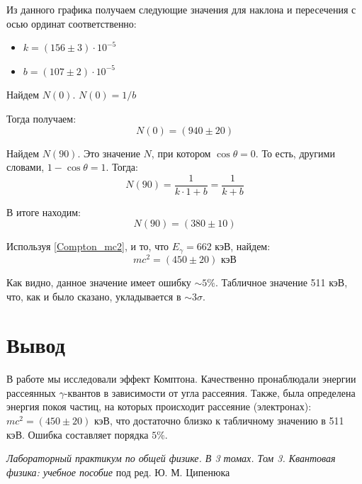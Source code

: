 \documentclass[12pt,a4paper]{article}
\begin{document}
	Из данного графика получаем следующие значения для наклона и пересечения с осью ординат соответственно:
	\begin{itemize}
		\item $k = (156 \pm 3) \cdot 10^{-5}$
		
		\item $b = (107 \pm 2) \cdot 10^{-5}$
	\end{itemize}
	
	Найдем $N(0)$. $N(0) = 1/b$

	Тогда получаем:
	\begin{equation*}
		\boxed{N(0) = (940 \pm 20)}
	\end{equation*}

	Найдем $N(90)$. Это значение $N$, при котором $\cos\theta = 0$. То есть, другими словами, $1 - \cos\theta = 1$. Тогда:
	\begin{equation*}
		N(90) = \frac{1}{k \cdot 1 + b} = \frac{1}{k + b}
	\end{equation*}

	В итоге находим:
	\begin{equation*}
		\boxed{N(90) = (380 \pm 10)}
	\end{equation*}

	
	Используя \eqref{Compton_mc2}, и то, что $E_\gamma = 662$ кэВ, найдем:
	\begin{equation*}
		\boxed{mc^2 = (450 \pm 20)\text{ кэВ}}
	\end{equation*}

	Как видно, данное значение имеет ошибку $\sim 5\%$. Табличное значение 511 кэВ, что, как и было сказано, укладывается в $\sim 3\sigma$.
	

    \clearpage
    
	\section*{Вывод}
 
    В работе мы исследовали эффект Комптона. Качественно пронаблюдали энергии рассеянных $\gamma$-квантов в зависимости от угла рассеяния. Также, была определена энергия покоя частиц, на которых происходит рассеяние (электронах): $mc^2 = (450 \pm 20)\text{ кэВ}$, что достаточно близко к табличному значению в 511 кэВ. Ошибка составляет порядка $5\%$.

    \vfill
    
    \begin{thebibliography}{9}
    	 \emph{Лабораторный практикум по общей физике. В 3 томах. Том 3. Квантовая физика: учебное пособие} под ред. Ю. М. Ципенюка
    \end{thebibliography}
\end{document}
